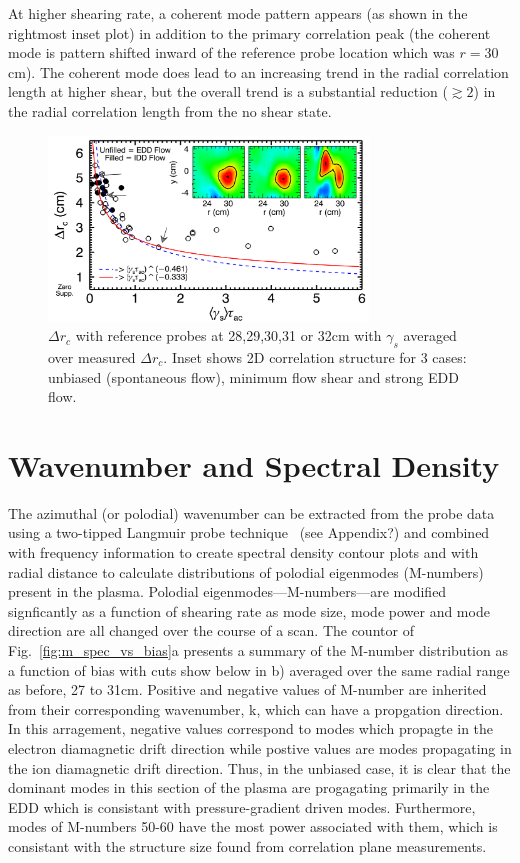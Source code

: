 \documentclass[aip,pop,amsmath,amssymb,preprint,superscriptaddress]{revtex4-1} %
\begin{document}

At higher shearing rate, a coherent mode
pattern appears (as shown in the rightmost inset plot) in addition to
the primary correlation peak (the coherent mode is
pattern shifted inward of the reference probe location which was $r=30$cm).  The coherent
mode does lead to an increasing trend in the radial correlation length
at higher shear, but the overall trend is a substantial reduction
($\gtrsim 2$) in the radial correlation length from the no shear state.

\begin{figure}[!htbp]
\centerline{
\includegraphics[width=8.5cm]{radcorr}}
\caption{\label{fig:radcorr} $\Delta r_{c}$ with
  reference probes at 28,29,30,31 or 32cm with $\gamma_{s}$ averaged over measured $\Delta r_{c}$.  Inset shows 2D correlation
  structure for 3 cases: unbiased (spontaneous flow), minimum flow
  shear and strong EDD flow.}
\end{figure}



\section{Wavenumber and Spectral Density}

The azimuthal (or polodial) wavenumber can be extracted from the probe data using  a two-tipped Langmuir probe technique~\cite{beall82} (see Appendix?) and combined with frequency information to create spectral density contour plots and with radial distance to calculate distributions of polodial eigenmodes (M-numbers) present in the plasma. Polodial eigenmodes---M-numbers---are modified signficantly as a function of shearing rate as mode size, mode power and mode direction are all changed over the course of a scan. The countor of Fig.~\ref{fig:m_spec_vs_bias}a presents a summary of the M-number distribution as a function of bias with cuts show below in b) averaged over the same radial range as before, 27 to 31cm. Positive and negative values of M-number are inherited from their corresponding wavenumber, k, which can have a propgation direction. In this arragement, negative values correspond to modes which propagte in the electron diamagnetic drift direction while postive values are modes propagating in the ion diamagnetic drift direction. Thus, in the unbiased case, it is clear that the dominant modes in this section of the plasma are progagating primarily in the EDD which is consistant with pressure-gradient driven modes. Furthermore, modes of M-numbers 50-60 have the most power associated with them, which is consistant with the structure size found from correlation plane measurements.
\end{document}
